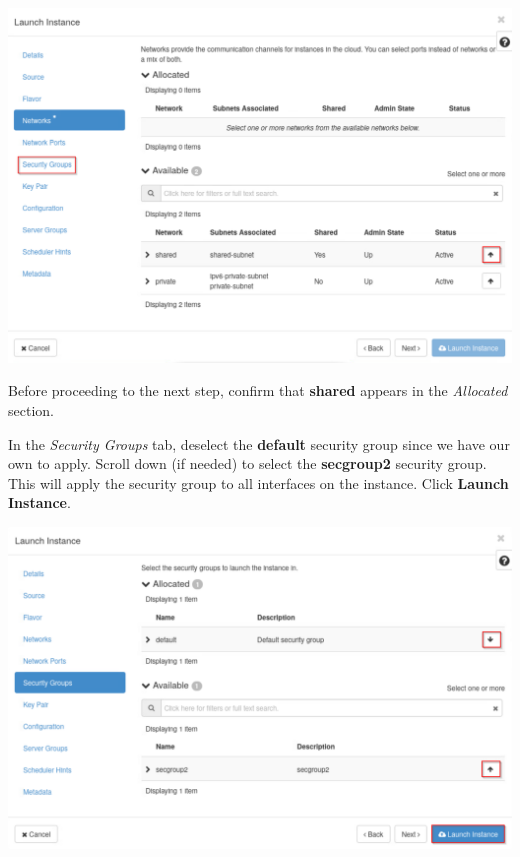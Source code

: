 \documentclass[letterpaper, 12pt]{article}
\begin{document}
\begin{enumerate}
\begin{labstep}
        \begin{center}
            \includegraphics[width=\linewidth]{images/part6/step14.png}
        \end{center}
    \end{labstep}

    \begin{stopbox}
        Before proceeding to the next step, confirm that \textbf{shared} appears in the \textit{Allocated} section.
    \end{stopbox}

    \begin{labstep}
        In the \textit{Security Groups} tab, deselect the \textbf{default} security group since we have our own to apply.
        Scroll down (if needed) to select the \textbf{secgroup2} security group.
        This will apply the security group to all interfaces on the instance.
        Click \textbf{Launch Instance}.

        \begin{center}
            \includegraphics[width=\linewidth]{images/part6/step15.png}
        \end{center}
    \end{labstep}


\end{enumerate}
\end{document}
